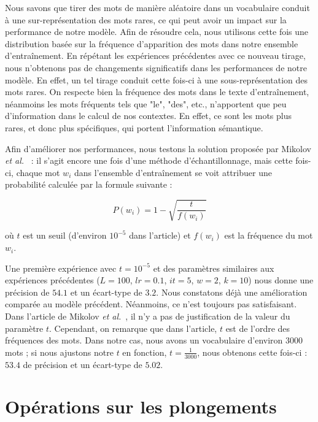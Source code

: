 \documentclass[12pt]{article}
\begin{document}
Nous savons que tirer des mots de manière aléatoire dans un vocabulaire conduit à une sur-représentation des mots rares, ce qui peut avoir un impact sur la performance de notre modèle. Afin de résoudre cela, nous utilisons cette fois une distribution basée sur la fréquence d'apparition des mots dans notre ensemble d'entraînement. 
En répétant les expériences précédentes avec ce nouveau tirage, nous n'obtenons pas de changements significatifs dans les performances de notre modèle. 
En effet, un tel tirage conduit cette fois-ci à une sous-représentation des mots rares. On respecte bien la fréquence des mots dans le texte d'entraînement, 
néanmoins les mots fréquents tels que "le", "des", etc., n'apportent que peu d'information dans le calcul de nos contextes. En effet, ce sont les mots plus rares, 
et donc plus spécifiques, qui portent l'information sémantique. 

Afin d'améliorer nos performances, nous testons la solution proposée par Mikolov \textit{et al.}~\cite{mikolov2013distributed} : 
il s'agit encore une fois d'une méthode d'échantillonnage, mais cette fois-ci, chaque mot $w_i$ dans l'ensemble d'entraînement se voit attribuer une probabilité calculée par la formule suivante :

\[
P(w_i) = 1 - \sqrt{\frac{t}{f(w_i)}}
\]

où $t$ est un seuil (d'environ $10^{-5}$ dans l'article) et $f(w_i)$ est la fréquence du mot $w_i$.

Une première expérience avec $t=10^{-5}$ et des paramètres similaires aux expériences précédentes ($L = 100$, $lr = 0.1$, $it = 5$, $w = 2$, $k = 10$) 
nous donne une précision de $54.1$ et un écart-type de $3.2$. Nous constatons déjà une amélioration comparée au modèle précédent. Néanmoins, ce n'est toujours pas satisfaisant. 
Dans l'article de Mikolov \textit{et al.}~\cite{mikolov2013distributed}, il n'y a pas de justification de la valeur du paramètre $t$. Cependant, on remarque 
que dans l'article, $t$ est de l'ordre des fréquences des mots. 
Dans notre cas, nous avons un vocabulaire d'environ 3000 mots ; si nous ajustons notre $t$ en fonction, $t=\frac{1}{3000}$, nous obtenons cette fois-ci :\\
$53.4$ de précision et un écart-type de $5.02$.



\section{Opérations sur les plongements} 
\end{document}
